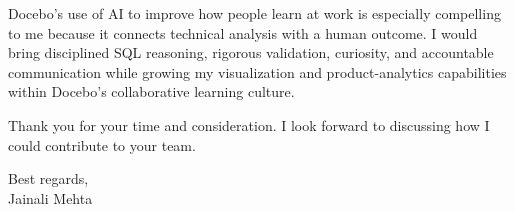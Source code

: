 \documentclass[letterpaper,11pt]{article}
\begin{document}
\bigbreak
Docebo's use of AI to improve how people learn at work is especially compelling to me because it connects technical analysis with a human outcome. I would bring disciplined SQL reasoning, rigorous validation, curiosity, and accountable communication while growing my visualization and product-analytics capabilities within Docebo's collaborative learning culture.

\bigbreak
Thank you for your time and consideration. I look forward to discussing how I could contribute to your team.

\bigbreak
Best regards,\\
Jainali Mehta
\end{document}
